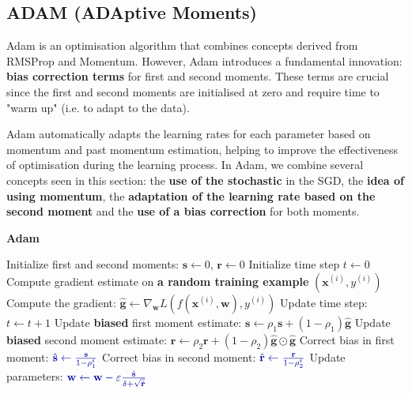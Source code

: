 \subsection{ADAM (ADAptive Moments)}
Adam is an optimisation algorithm that combines concepts derived from RMSProp and Momentum.  However, Adam introduces a fundamental innovation: \textbf{bias correction terms} for first and second moments. These terms are crucial since the first and second moments are initialised at zero and require time to "warm up" (i.e. to adapt to the data).

Adam automatically adapts the learning rates for each parameter based on momentum and past momentum estimation, helping to improve the effectiveness of optimisation during the learning process. In Adam, we combine several concepts seen in this section: the \textbf{use of the stochastic} in the SGD, the \textbf{idea of using momentum}, the \textbf{adaptation of the learning rate based on the second moment} and the \textbf{use of a bias correction} for both moments.
\newpage
\begin{algorithm}
\renewcommand\thealgorithm{}
\caption{\textbf{\textcolor{mygreen}{Adam}}}
\begin{algorithmic}[1]
\STATE Initialize first and second moments: $\mathbf{s} \leftarrow 0$, $\mathbf{r} \leftarrow 0$
\STATE Initialize time step $t \leftarrow 0$
\STATE Compute gradient estimate on \textbf{\textcolor{myred}{a random training example}} $(\mathbf{x}^{(i)}, y^{(i)})$
\STATE Compute the gradient: $\mathbf{\hat{g}} \leftarrow \nabla_{\mathbf{w}} L(f(\mathbf{x}^{(i)},\mathbf{w}), y^{(i)})$
\STATE Update time step: $t \leftarrow t + 1$
\STATE Update \textbf{biased} first moment estimate:
$\mathbf{s} \leftarrow \rho_1 \mathbf{s} + (1 - \rho_1) \mathbf{\hat{g}}$ \qquad \quad \qquad \COMMENT{\textbf{\textcolor{gray!90!white}{Momentum Idea}}}
\STATE Update \textbf{biased} second moment estimate:
$\mathbf{r} \leftarrow \rho_2 \mathbf{r} + (1 - \rho_2) \mathbf{\hat{g}} \odot \mathbf{\hat{g}}$ \qquad \COMMENT{\textbf{\textcolor{gray!90!white}{RMSProp Idea}}}
\STATE Correct bias in first moment: $\textcolor{mybluee}{\hat{\mathbf{s}} \leftarrow \frac{\mathbf{s}}{1 - \rho_1^t}}$
\STATE Correct bias in second moment: $\textcolor{mybluee}{\hat{\mathbf{r}} \leftarrow \frac{\mathbf{r}}{1 - \rho_2^t}}$
\STATE Update parameters:
$\textcolor{mybluee}{\mathbf{w} \leftarrow \mathbf{w} - \varepsilon \frac{\hat{\mathbf{s}}}{\delta + \sqrt{\hat{\mathbf{r}}}}}$
\ENDWHILE
\end{algorithmic}
\end{algorithm}


